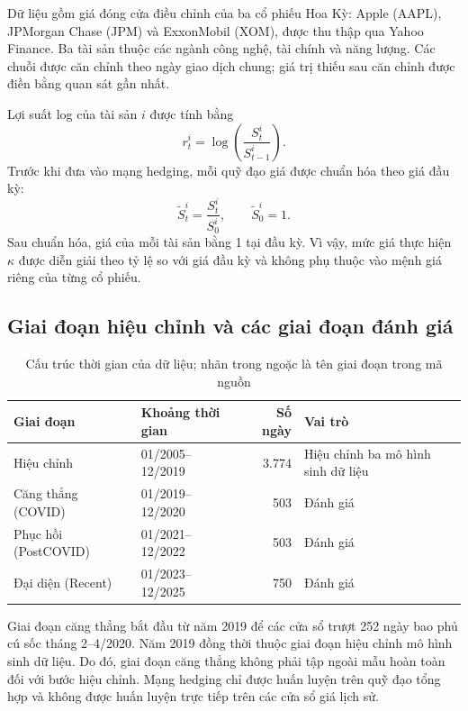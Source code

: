 Dữ liệu gồm giá đóng cửa điều chỉnh của ba cổ phiếu Hoa Kỳ: Apple (AAPL),
JPMorgan Chase (JPM) và ExxonMobil (XOM), được thu thập qua Yahoo Finance. Ba
tài sản thuộc các ngành công nghệ, tài chính và năng lượng. Các chuỗi được căn
chỉnh theo ngày giao dịch chung; giá trị thiếu sau căn chỉnh được điền bằng
quan sát gần nhất.

Lợi suất log của tài sản $i$ được tính bằng
\begin{equation}
    r_t^i=\log\left(\frac{S_t^i}{S_{t-1}^i}\right).
    \label{eq:c3-log-return}
\end{equation}
Trước khi đưa vào mạng hedging, mỗi quỹ đạo giá được chuẩn hóa theo giá đầu
kỳ:
\begin{equation}
    \widetilde S_t^i=\frac{S_t^i}{S_0^i},
    \qquad \widetilde S_0^i=1.
    \label{eq:c3-normalized-price}
\end{equation}
Sau chuẩn hóa, giá của mỗi tài sản bằng 1 tại đầu kỳ. Vì vậy, mức giá thực hiện
$\kappa$ được diễn giải theo tỷ lệ so với giá đầu kỳ và không phụ thuộc vào
mệnh giá riêng của từng cổ phiếu.

\subsection{Giai đoạn hiệu chỉnh và các giai đoạn đánh giá}

\begin{table}[H]
\centering
\small
\caption{Cấu trúc thời gian của dữ liệu; nhãn trong ngoặc là tên giai đoạn trong mã nguồn}
\label{tab:c3-periods}
\begin{tabular}{@{}llrl@{}}
\toprule
\textbf{Giai đoạn} & \textbf{Khoảng thời gian} & \textbf{Số ngày} &
\textbf{Vai trò}\\
\midrule
Hiệu chỉnh & 01/2005--12/2019 & 3.774 & Hiệu chỉnh ba mô hình sinh dữ liệu\\
Căng thẳng (COVID) & 01/2019--12/2020 & 503 & Đánh giá\\
Phục hồi (PostCOVID) & 01/2021--12/2022 & 503 & Đánh giá\\
Đại diện (Recent) & 01/2023--12/2025 & 750 & Đánh giá\\
\bottomrule
\end{tabular}
\end{table}

Giai đoạn căng thẳng bắt đầu từ năm 2019 để các cửa sổ trượt 252 ngày bao phủ cú sốc
tháng 2--4/2020. Năm 2019 đồng thời thuộc giai đoạn hiệu chỉnh mô hình sinh dữ
liệu. Do đó, giai đoạn căng thẳng không phải tập ngoài mẫu hoàn toàn đối với bước
hiệu chỉnh. Mạng hedging chỉ được huấn luyện trên quỹ đạo tổng hợp và không
được huấn luyện trực tiếp trên các cửa sổ giá lịch sử.

